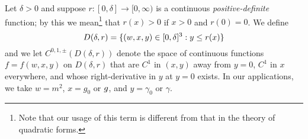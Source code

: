 

Let $\delta > 0$ and suppose $r : [0, \delta] \to [0, \infty)$
is a continuous \emph{positive-definite} function; by this we
mean\footnote{Note that our usage of this term is
different from that in the theory of quadratic forms.}
that $r(x) > 0$ if $x > 0$ and $r(0) = 0$.
We define
\begin{equation}
\lbeq{Ddef}
D(\delta, r)
	=
\new{\{ (w, x, y) \in [0, \delta]^3 : y \leq r(x) \}}
\end{equation}
and we let $C^{0,1,\pm}(D(\delta, r))$ denote the space of continuous functions
$f = f(w, x, y)$ on $D(\delta, r)$
that are $C^1$ in $(x, y)$ away from $y = 0$, $C^1$ in $x$ everywhere,
and whose right-derivative in $y$ at $y = 0$ exists.
In our applications, we take $w = m^2$, $x = g_0$ or $g$,
and $y = \gamma_0$ or $\gamma$.

